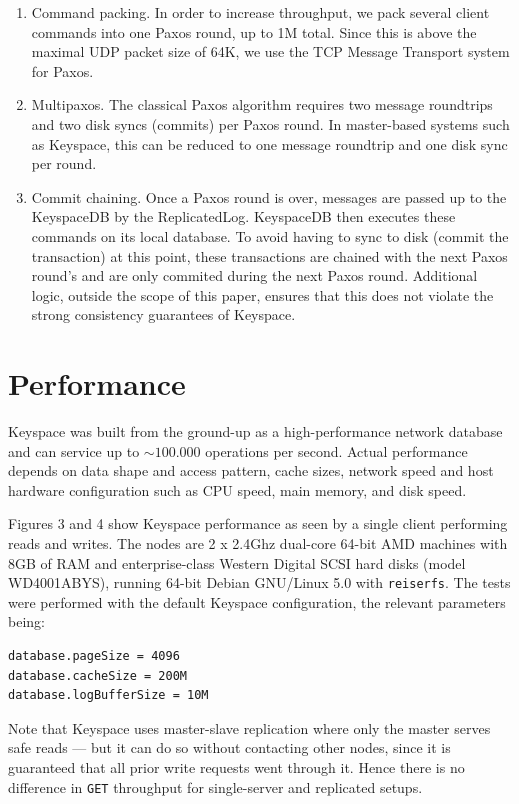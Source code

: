 \documentclass[12pt]{article}
\begin{document}
\begin{enumerate}
\item Command packing. In order to increase throughput, we pack several client commands into one Paxos round, up to 1M total. Since this is above the maximal UDP packet size of 64K, we use the TCP Message Transport system for Paxos.
\item Multipaxos. The classical Paxos algorithm requires two message roundtrips and two disk syncs (commits) per Paxos round. In master-based systems such as Keyspace, this can be reduced to one message roundtrip and one disk sync per round.
\item Commit chaining. Once a Paxos round is over, messages are passed up to the KeyspaceDB by the ReplicatedLog. KeyspaceDB then executes these commands on its local database. To avoid having to sync to disk (commit the transaction) at this point, these transactions are chained with the next Paxos round's and are only commited during the next Paxos round. Additional logic, outside the scope of this paper, ensures that this does not violate the strong consistency guarantees of Keyspace.
\end{enumerate}

\section{ Performance }

Keyspace was built from the ground-up as a high-performance network database and can service up to $\sim 100.000$ operations per second. Actual performance depends on data shape and access pattern, cache sizes, network speed and host hardware configuration such as CPU speed, main memory, and disk speed.

Figures 3 and 4 show Keyspace performance as seen by a single client performing reads and writes. The nodes are 2 x 2.4Ghz dual-core 64-bit AMD machines with 8GB of RAM and enterprise-class Western Digital SCSI hard disks (model WD4001ABYS), running 64-bit Debian GNU/Linux 5.0 with \texttt{reiserfs}. The tests were performed with the default Keyspace configuration, the relevant parameters being:

\begin{verbatim}
database.pageSize = 4096
database.cacheSize = 200M
database.logBufferSize = 10M
\end{verbatim}

Note that Keyspace uses master-slave replication where only the master serves safe reads --- but it can do so without contacting other nodes, since it is guaranteed that all prior write requests went through it. Hence there is no difference in \texttt{GET} throughput for single-server and replicated setups.
\end{document}
